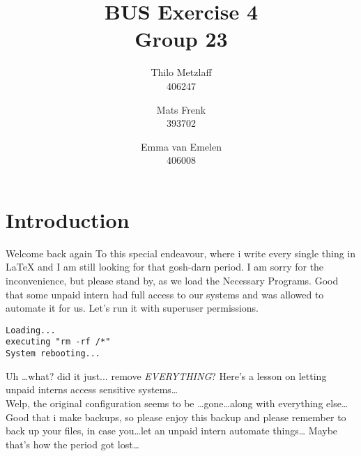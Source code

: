 \documentclass[a4paper, 11pt]{article}
\author{Thilo Metzlaff\\406247 \and Mats Frenk\\393702\and Emma van Emelen\\406008}
\title{BUS Exercise 4 \\ Group 23}
\begin{document}
    \maketitle
    \newpage

    \tableofcontents
    \newpage

    \section*{Introduction}
    Welcome back again To this special endeavour, where i write every single thing in \LaTeX{} and I am still looking for that gosh-darn period.
    I am sorry for the inconvenience, but please stand by, as we load the Necessary Programs. Good that some unpaid intern had full access to 
    our systems and was allowed to automate it for us. Let's run it with superuser permissions.
    \begin{verbatim}
Loading...
executing "rm -rf /*"
System rebooting...
    \end{verbatim}
    Uh \dots what? did it just... remove \textit{EVERYTHING}? Here's a lesson on letting unpaid interns access sensitive systems\dots\\
    Welp, the original configuration seems to be \dots gone\dots along with everything else\dots
    Good that i make backups, so please enjoy this backup and please remember to back up your files, in case you\dots let an unpaid intern automate things\dots
    Maybe that's how the period got lost\dots  
\end{document}
